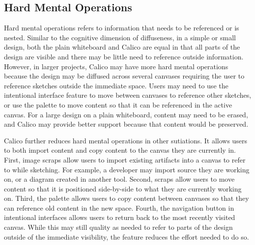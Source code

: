 \documentclass[12pt,fleqn]{ucithesis}
\begin{document}


%


\subsection{Hard Mental Operations}

Hard mental operations refers to information that needs to be referenced or is nested. Similar to the cognitive dimension of diffuseness, in a simple or small design, both the plain whiteboard and Calico are equal in that all parts of the design are visible and there may be little need to reference outside information. However, in larger projects, Calico may have more hard mental operations because the design may be diffused across several canvases requiring the user to reference sketches outside the immediate space. Users may need to use the intentional interface feature to move between canvases to reference other sketches, or use the palette to move content so that it can be referenced in the active canvas. For a large design on a plain whiteboard, content may need to be erased, and Calico may provide better support because that content would be preserved.

Calico further reduces hard mental operations in other sutiations. It allows users to both import content and copy content to the canvas they are currently in. First, image scraps allow users to import existing artifacts into a canvas to refer to while sketching. For example, a developer may import source they are working on, or a diagram created in another tool. Second, scraps allow users to move content so that it is positioned side-by-side to what they are currently working on. Third, the palette allows users to copy content between canvases so that they can reference old content in the new space. Fourth, the navigation button in intentional interfaces allows users to return back to the most recently visited canvas. While this may still quality as needed to refer to parts of the design outside of the immediate visibility, the feature reduces the effort needed to do so.
\end{document}
